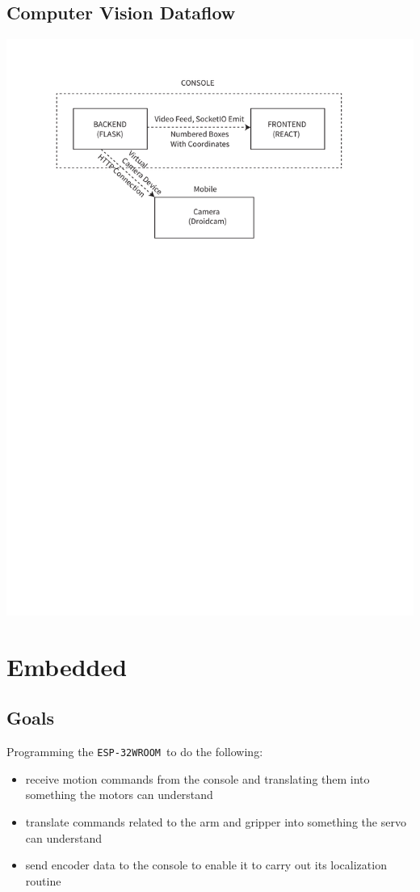 \documentclass[a4paper,12pt]{article}
\newcommand{\esp}{\texttt{ESP-32WROOM}}
\begin{document}
\subsection{Computer Vision Dataflow} \label{visflow}
\includegraphics[trim=40 550 0 57,scale=0.95,clip]{diagrams/vis.pdf}

\section{Embedded}
\subsection*{Goals}
Programming the \esp\ to do the following:
\begin{itemize}
    \item receive motion commands from the console and translating them into something the motors can understand
    \item translate commands related to the arm and gripper into something the servo can understand
    \item send encoder data to the console to enable it to carry out its localization routine
\end{itemize}
\end{document}
